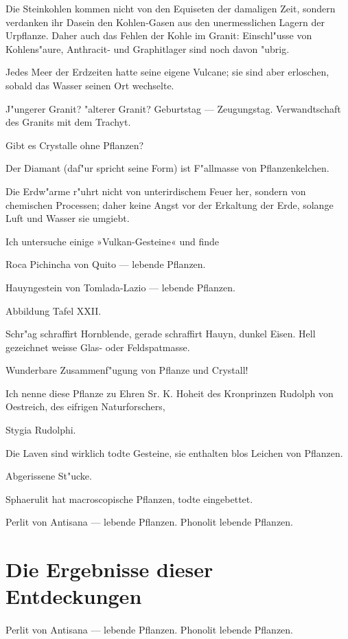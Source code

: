 \documentclass[a4paper, 11pt, oneside, german]{article}
\begin{document}
Die Steinkohlen kommen nicht von den Equiseten der damaligen Zeit, sondern verdanken ihr Dasein den Kohlen-Gasen aus den unermesslichen Lagern der Urpflanze. Daher auch das Fehlen der Kohle im Granit: Einschl"usse von Kohlens"aure, Anthracit- und Graphitlager sind noch davon "ubrig.

Jedes Meer der Erdzeiten hatte seine eigene Vulcane; sie sind aber erloschen, sobald das Wasser seinen Ort wechselte.

J"ungerer Granit? "alterer Granit? Geburtstag --- Zeugungstag. Verwandtschaft des Granits mit dem Trachyt.

Gibt es Crystalle ohne Pflanzen?

Der Diamant (daf"ur spricht seine Form) ist F"allmasse von Pflanzenkelchen.

Die Erdw"arme r"uhrt nicht von unterirdischem Feuer her, sondern von chemischen Processen; daher keine Angst vor der Erkaltung der Erde, solange Luft und Wasser sie umgiebt.

Ich untersuche einige »Vulkan-Gesteine« und finde

Roca Pichincha von Quito --- lebende Pflanzen.

Hauyngestein von Tomlada-Lazio --- lebende Pflanzen.

Abbildung Tafel XXII.

Schr"ag schraffirt Hornblende, gerade schraffirt Hauyn, dunkel Eisen. Hell gezeichnet weisse Glas- oder Feldspatmasse.

Wunderbare Zusammenf"ugung von Pflanze und Crystall!

Ich nenne diese Pflanze zu Ehren Sr. K. Hoheit des Kronprinzen Rudolph von Oestreich, des eifrigen Naturforschers,

Stygia Rudolphi.

Die Laven sind wirklich todte Gesteine, sie enthalten blos Leichen von Pflanzen.

Abgerissene St"ucke.

Sphaerulit hat macroscopische Pflanzen, todte eingebettet.

Perlit von Antisana --- lebende Pflanzen. Phonolit lebende Pflanzen.
\clearpage
\section{Die Ergebnisse dieser Entdeckungen}
\paragraph{}
Perlit von Antisana --- lebende Pflanzen. Phonolit lebende Pflanzen.
\end{document}
